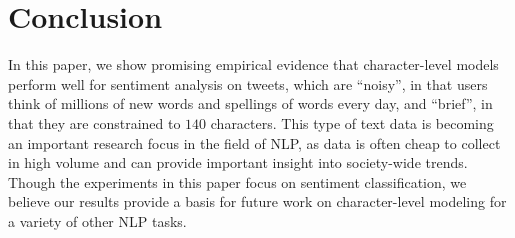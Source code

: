 \documentclass{article} %
\begin{document}
\section{Conclusion}
In this paper, we show promising empirical evidence that character-level models perform well for sentiment analysis on tweets, which are ``noisy'', in that users think of millions of new words and spellings of words every day, and ``brief'', in that they are constrained to $140$ characters. This type of text data is becoming an important research focus in the field of NLP, as data is often cheap to collect in high volume and can provide important insight into society-wide trends. Though the experiments in this paper focus on sentiment classification, we believe our results provide a basis for future work on character-level modeling for a variety of other NLP tasks.






\end{document}
